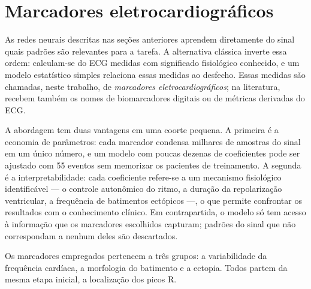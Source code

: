 %
%

\section{Marcadores eletrocardiográficos}
\label{sec:fund-marcadores}

As redes neurais descritas nas seções anteriores aprendem diretamente do
sinal quais padrões são relevantes para a tarefa. A alternativa clássica
inverte essa ordem: calculam-se do \gls{ECG} medidas com significado
fisiológico conhecido, e um modelo estatístico simples relaciona essas
medidas ao desfecho. Essas medidas são chamadas, neste trabalho, de
\textit{marcadores eletrocardiográficos}; na literatura, recebem também os
nomes de biomarcadores digitais ou de métricas derivadas do \gls{ECG}.

A abordagem tem duas vantagens em uma coorte pequena. A primeira é a
economia de parâmetros: cada marcador condensa milhares de amostras do sinal
em um único número, e um modelo com poucas dezenas de coeficientes pode ser
ajustado com 55 eventos sem memorizar os pacientes de treinamento. A segunda
é a interpretabilidade: cada coeficiente refere-se a um mecanismo
fisiológico identificável --- o controle autonômico do ritmo, a duração da
repolarização ventricular, a frequência de batimentos ectópicos ---, o que
permite confrontar os resultados com o conhecimento clínico. Em
contrapartida, o modelo só tem acesso à informação que os marcadores
escolhidos capturam; padrões do sinal que não correspondam a nenhum deles
são descartados.

Os marcadores empregados pertencem a três grupos: a variabilidade da
frequência cardíaca, a morfologia do batimento e a ectopia. Todos partem da
mesma etapa inicial, a localização dos picos R.

